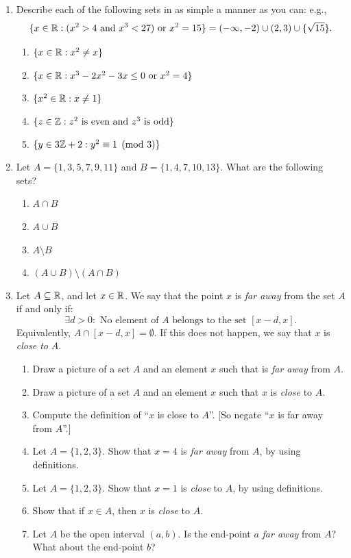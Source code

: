 \begin{exercises}{}{}

\begin{enumerate}
  \item Describe each of the following sets in as simple a manner as you can: e.g.,
  \[\{x\in\mathbb{R}:(x^2>4\text{ and } x^3<27)\text{ or } x^2=15\}=(-\infty,-2)\cup (2,3)\cup\{\sqrt{15}\}.\]
	\begin{enumerate}
	  	\item $\{x\in\mathbb{R}:x^2\neq x\}$
	  	\item $\{x\in\mathbb{R}:x^3-2x^2-3x\le 0\text{ or }x^2=4\}$
	  	\item $\{x^2\in\mathbb{R}:x \neq 1\}$
	  	\item $\{z\in\mathbb{Z}:z^2\text{ is even and $z^3$ is odd}\}$
		  \item $\{y\in 3\mathbb{Z}+2:y^2\equiv 1\pmod 3\}$
		\end{enumerate}
  
  \item Let $A=\{1,3,5,7,9,11\}$ and $B=\{1,4,7,10,13\}$. What are the following sets?
    \begin{enumerate}
	  	\item $A\cap B$
	  	\item $A\cup B$
	  	\item $A\setminus B$
	  	\item $(A\cup B)\setminus (A\cap B)$
		\end{enumerate}
	
  	
  \item Let $A\subseteq\mathbb{R}$, and let $x\in\mathbb{R}$. We say that the point $x$ is \emph{far away} from the set $A$ if and only if:
  \[\exists d>0\colon\text{ No element of $A$ belongs to the set $[x-d,x]$}.\]
	Equivalently, $A\cap[x-d,x]=\emptyset$. 
	If this does not happen, we say that $x$ is \emph{close to} $A$.
  	\begin{enumerate}
			\item Draw a picture of a set $A$ and an element $x$ such that is  \emph{far away} from $A$. 
			\item Draw a picture of a set $A$ and an element  $x$  such that $x$ is \emph{close} to $A$.
			\item Compute the definition of ``$x$ is close to $A$''. [So negate ``$x$ is far away from $A$''.]
			\item Let $A=\{1,2,3\}$. Show that $x=4$ is \emph{far away} from $A$, by using definitions.
			\item Let $A=\{1,2,3\}$. Show that $x=1$ is \emph{close} to  $A$, by using definitions.
			\item Show that if $x\in A$, then $x$ is \emph{close} to $A$.
			\item Let $A$ be the open interval $(a,b)$. Is the end-point $a$ \emph{far away} from $A$?  What about the end-point $b$?
  	\end{enumerate}
  	

\end{enumerate}
\end{exercises}
